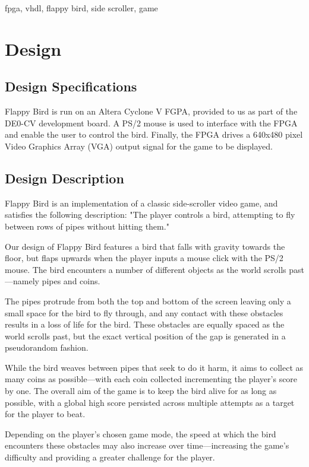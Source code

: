 \documentclass[conference]{IEEEtran}
\begin{document}
\begin{IEEEkeywords}
	fpga, vhdl, flappy bird, side scroller, game
\end{IEEEkeywords}

\section{Design}

\subsection{Design Specifications}

Flappy Bird is run on an Altera Cyclone V FGPA, provided to us as part of the DE0-CV development board. A PS/2 mouse is used to interface with the FPGA and enable the user to control the bird. Finally, the FPGA drives a 640x480 pixel Video Graphics Array (VGA) output signal for the game to be displayed.

\subsection{Design Description}

Flappy Bird is an implementation of a classic side-scroller video game, and satisfies the following description: "The player controls a bird, attempting to fly between rows of pipes without hitting them."

Our design of Flappy Bird features a bird that falls with gravity towards the floor, but flaps upwards when the player inputs a mouse click with the PS/2 mouse. The bird encounters a number of different objects as the world scrolls past—namely pipes and coins.

The pipes protrude from both the top and bottom of the screen leaving only a small space for the bird to fly through, and any contact with these obstacles results in a loss of life for the bird. These obstacles are equally spaced as the world scrolls past, but the exact vertical position of the gap is generated in a pseudorandom fashion.

While the bird weaves between pipes that seek to do it harm, it aims to collect as many coins as possible—with each coin collected incrementing the player's score by one. The overall aim of the game is to keep the bird alive for as long as possible, with a global high score persisted across multiple attempts as a target for the player to beat.

Depending on the player's chosen game mode, the speed at which the bird encounters these obstacles may also increase over time—increasing the game's difficulty and providing a greater challenge for the player.
\end{document}

